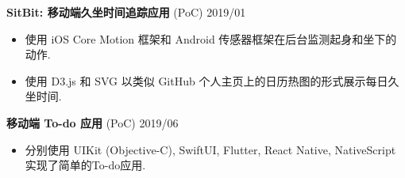 \documentclass[10.5pt]{article}
\begin{document}
\textbf{SitBit: 移动端久坐时间追踪应用} (PoC) \hfill 2019/01
\begin{itemize}
\item 使用 iOS Core Motion 框架和 Android 传感器框架在后台监测起身和坐下的动作.
\item 使用 D3.js 和 SVG 以类似 GitHub 个人主页上的日历热图的形式展示每日久坐时间.
\end{itemize}

\textbf{移动端 To-do 应用} (PoC) \hfill 2019/06
\begin{itemize}
\item 分别使用 UIKit (Objective-C), SwiftUI, Flutter, React Native, NativeScript 实现了简单的To-do应用.
\end{itemize}
\end{document}
